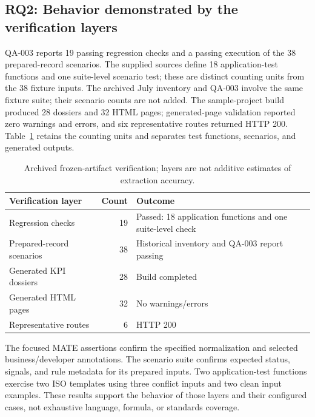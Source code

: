 \documentclass[a4paper,fleqn]{cas-dc}
\begin{document}
\subsection{RQ2: Behavior demonstrated by the verification layers}
\label{sec:scenario-results}

QA-003 reports 19 passing regression checks and a passing execution of the 38 prepared-record scenarios. The supplied sources define 18 application-test functions and one suite-level scenario test; these are distinct counting units from the 38 fixture inputs. The archived July inventory and QA-003 involve the same fixture suite; their scenario counts are not added. The sample-project build produced 28 dossiers and 32 HTML pages; generated-page validation reported zero warnings and errors, and six representative routes returned HTTP 200. Table~\ref{tab:frozen-verification} retains the counting units and separates test functions, scenarios, and generated outputs.

\begin{table}[!t]
\centering
\caption{Archived frozen-artifact verification; layers are not additive estimates of extraction accuracy.}
\label{tab:frozen-verification}
\small
\begin{tabularx}{\columnwidth}{>{\raggedright\arraybackslash}X r >{\raggedright\arraybackslash}X}
\toprule
\textbf{Verification layer} & \textbf{Count} & \textbf{Outcome} \\
\midrule
Regression checks & 19 & Passed: 18 application functions and one suite-level check \\
Prepared-record scenarios & 38 & Historical inventory and QA-003 report passing \\
Generated KPI dossiers & 28 & Build completed \\
Generated HTML pages & 32 & No warnings/errors \\
Representative routes & 6 & HTTP 200 \\
\bottomrule
\end{tabularx}
\end{table}

The focused MATE assertions confirm the specified normalization and selected business/developer annotations. The scenario suite confirms expected status, signals, and rule metadata for its prepared inputs. Two application-test functions exercise two ISO templates using three conflict inputs and two clean input examples. These results support the behavior of those layers and their configured cases, not exhaustive language, formula, or standards coverage.
\end{document}
